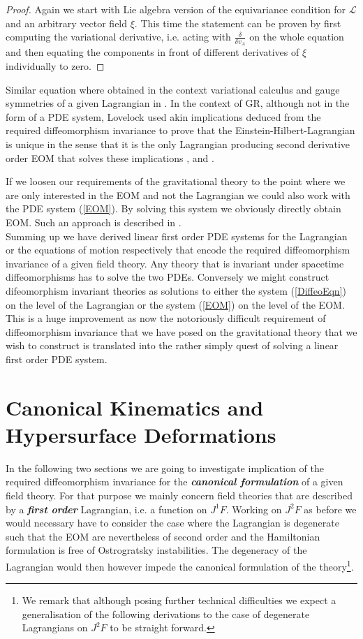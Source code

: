\documentclass[a4paper,12pt, DIV=14, BCOR=5mm, twoside, headsepline]{scrbook}
\begin{document}
\begin{proof}
Again we start with Lie algebra version of the equivariance condition for $\mathcal{L}$ and an arbitrary vector field $\xi$. This time the statement can be proven by first computing the variational derivative, i.e. acting with $\frac{\delta}{\delta v_A}$ on the whole equation and then equating the components in front of different derivatives of $\xi$ individually to zero. 
\end{proof}
Similar equation where obtained in the context variational calculus and gauge symmetries of a given Lagrangian in \cite{article}. In the context of GR, although not in the form of a PDE system, Lovelock used akin implications deduced from the required diffeomorphism invariance to prove that the Einstein-Hilbert-Lagrangian is unique in the sense that it is the only Lagrangian producing second derivative order EOM that solves these implications \cite{Lovelock1969}, \cite{doi:10.1063/1.1666069} and \cite{doi:10.1063/1.1665613}. 

If we loosen our requirements of the gravitational theory to the point where we are only interested in the EOM and not the Lagrangian we could also work with the PDE system (\ref{EOM}). By solving this system we obviously directly obtain EOM. Such an approach is described in \cite{TobiR}.\\

Summing up we have derived linear first order PDE systems for the Lagrangian or the equations of motion respectively that encode the required diffeomorphism invariance of a given field theory. Any theory that is invariant under spacetime diffeomorphisms has to solve the two PDEs. Conversely we might construct difeomorphism invariant theories as solutions to either the system (\ref{DiffeoEqn}) on the level of the Lagrangian or the system (\ref{EOM}) on the level of the EOM. This is a huge improvement as now the notoriously difficult requirement of diffeomorphism invariance that we have posed on the gravitational theory that we wish to construct is translated into the rather simply quest of solving a linear first order PDE system. 



\section{Canonical Kinematics and Hypersurface Deformations}
In the following two sections we are going to investigate implication of the required diffeomorphism invariance for the \textit{\textbf{canonical formulation}} of a given field theory. For that purpose we mainly concern field theories that are described by a \textit{\textbf{first order}} Lagrangian, i.e. a function on $J^1F$. Working on $J^2F$ as before we would necessary have to consider the case where the Lagrangian is degenerate such that the EOM are nevertheless of second order and the Hamiltonian formulation is free of Ostrogratsky instabilities. The degeneracy of the Lagrangian would then however impede the canonical formulation of the theory\footnote{We remark that although posing further technical difficulties we expect a generalisation of the following derivations to the case of degenerate Lagrangians on $J^2F$ to be straight forward.}.
\end{document}
